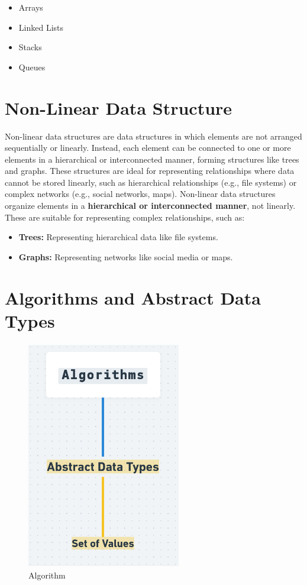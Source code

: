 \begin{itemize}
    \item Arrays
    \item Linked Lists
    \item Stacks
    \item Queues
\end{itemize}

\section*{\Large \textbf{Non-Linear Data Structure}}
Non-linear data structures are data structures in which elements are not arranged
sequentially or linearly. Instead, each element can be connected to one or more
elements in a hierarchical or interconnected manner, forming structures like trees
and graphs. These structures are ideal for representing relationships where data
cannot be stored linearly, such as hierarchical relationships (e.g., file systems) or
complex networks (e.g., social networks, maps).
Non-linear data structures organize elements in a \textbf{hierarchical or interconnected manner}, not linearly. These are suitable for representing complex relationships, such as:

\begin{itemize}
    \item \textbf{Trees:} Representing hierarchical data like file systems.
    \item \textbf{Graphs:} Representing networks like social media or maps.
\end{itemize}

\section*{\Large \textbf{Algorithms and Abstract Data Types}}

\begin{figure}[!ht]
  \centering
  \includegraphics[width=0.6\textwidth, height=10cm]{images/algo.png}
  \caption{Algorithm}
  \label{fig:algo_data}
\end{figure}


